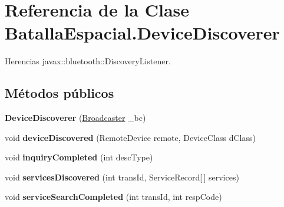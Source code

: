 \hypertarget{classBatallaEspacial_1_1DeviceDiscoverer}{
\section{Referencia de la Clase BatallaEspacial.DeviceDiscoverer}
\label{classBatallaEspacial_1_1DeviceDiscoverer}
}


Herencias javax::bluetooth::DiscoveryListener.

\subsection*{Métodos públicos}
\begin{DoxyCompactItemize}
\item 
\hypertarget{classBatallaEspacial_1_1DeviceDiscoverer_af6ecf5a3c37bcb72e16e4e2d2711ca6e}{
{\bfseries DeviceDiscoverer} (\hyperlink{classBatallaEspacial_1_1Broadcaster}{Broadcaster} \_\-bc)}
\label{classBatallaEspacial_1_1DeviceDiscoverer_af6ecf5a3c37bcb72e16e4e2d2711ca6e}

\item 
\hypertarget{classBatallaEspacial_1_1DeviceDiscoverer_a6cdbfd3299e1eadc9aaa2591fddacbe0}{
void {\bfseries deviceDiscovered} (RemoteDevice remote, DeviceClass dClass)}
\label{classBatallaEspacial_1_1DeviceDiscoverer_a6cdbfd3299e1eadc9aaa2591fddacbe0}

\item 
\hypertarget{classBatallaEspacial_1_1DeviceDiscoverer_ac4d3e6cdfd825b990dcef52d85780421}{
void {\bfseries inquiryCompleted} (int descType)}
\label{classBatallaEspacial_1_1DeviceDiscoverer_ac4d3e6cdfd825b990dcef52d85780421}

\item 
\hypertarget{classBatallaEspacial_1_1DeviceDiscoverer_aa29f2318289e2df973ebfe06430517cf}{
void {\bfseries servicesDiscovered} (int transId, ServiceRecord\mbox{[}$\,$\mbox{]} services)}
\label{classBatallaEspacial_1_1DeviceDiscoverer_aa29f2318289e2df973ebfe06430517cf}

\item 
\hypertarget{classBatallaEspacial_1_1DeviceDiscoverer_a2a5c9fe8ec1fc1f578102445f4fe9ff3}{
void {\bfseries serviceSearchCompleted} (int transId, int respCode)}
\label{classBatallaEspacial_1_1DeviceDiscoverer_a2a5c9fe8ec1fc1f578102445f4fe9ff3}

\end{DoxyCompactItemize}
